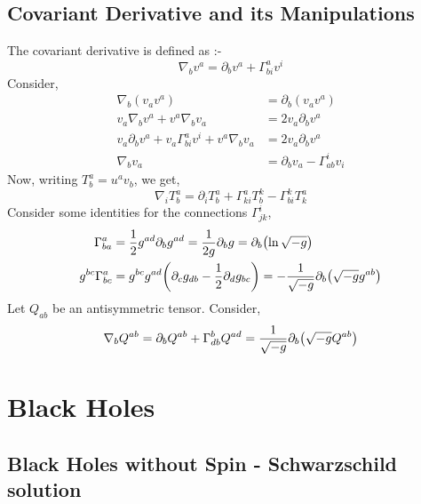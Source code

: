 \documentclass[a4paper,11pt]{article}
\begin{document}
\subsection{Covariant Derivative and its Manipulations}
The covariant derivative is defined as :-
\begin{equation}\label{key}
\nabla_b v^a = \partial_b v^a + \Gamma^{a}_{bi} v^i
\end{equation}
Consider,
\begin{align*}
\nabla_b (v_a v^a) &= \partial_b (v_a v^a) \\
v_a \nabla_b v^a + v^a \nabla_b v_a&= 2 v_a \partial_b v^a \\
 v_a \partial_b v^a + v_a \Gamma^{a}_{bi} v^i + v^a \nabla_b v_a &=2  v_a \partial_b v^a \\
\nabla_b v_a &= \partial_b v_a - \Gamma^{i}_{ab} v_i
\end{align*}
Now, writing $ T^a_b = u^a v_b $, we get,
\begin{equation}\label{key}
\nabla_i T^a_b = \partial_i T^a_b + \Gamma^a_{ki} T^k_b - \Gamma^k_{bi} T^a_k
\end{equation}
Consider some identities for the connections $ \Gamma^i_{jk} $,
\begin{align}\label{key}
\Gamma^a_{ba} &= \dfrac{1}{2} g^{ad} \partial_b g^{ad }= \dfrac{1}{2g} \partial_b g = \partial_b\qty(\ln\sqrt{-g}) \\
g^{bc}  \Gamma^a_{bc} &= g^{bc} g^{ad} \qty(\partial_c g_{db} - \dfrac{1}{2} \partial_d g_{bc}) = - \dfrac{1}{\sqrt{-g}} \partial_b \qty(\sqrt{-g} g^{ab})
\end{align}
Let $ Q_{ab} $ be an antisymmetric tensor. Consider,
\begin{equation}\label{key}
\nabla_b Q^{ab} = \partial_b Q^{ab} + \Gamma^b_{db} Q^{ad}  = \dfrac{1}{\sqrt{-g}} \partial_b \qty(\sqrt{-g} Q^{ab})
\end{equation}





\section{Black Holes}
\subsection{Black Holes without Spin - Schwarzschild solution}
\end{document}
